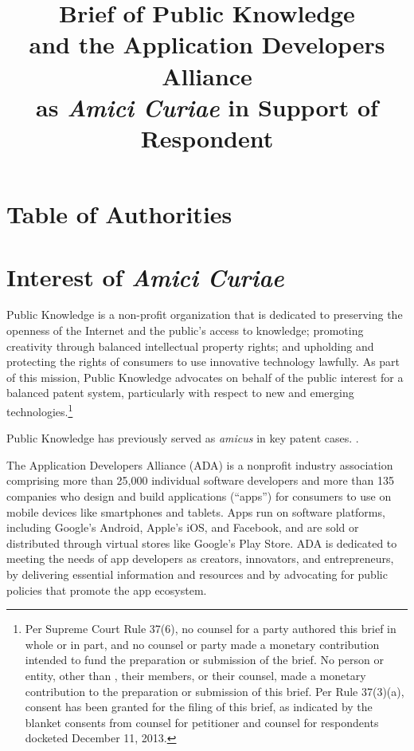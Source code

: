 \documentclass{scotus}
\title{Brief of Public Knowledge \protect\\
and the Application Developers Alliance \protect\\
as \emph{Amici Curiae} in Support of Respondent}
\begin{document}
\maketitle

\romanpagenumbers
\tableofcontents

\part{Table of Authorities}

\tableofauthorities

\clearpage
\arabicpagenumbers

\part{Interest of \emph{Amici Curiae}}

Public Knowledge is a non-profit organization that is dedicated to preserving
the openness of the Internet and the public's access to knowledge; promoting
creativity through balanced intellectual property rights; and upholding and
protecting the rights of consumers to use innovative technology lawfully. As
part of this mission, Public Knowledge advocates on behalf of the public
interest for a balanced patent system, particularly with respect to new and
emerging technologies.\footnote{Per Supreme Court Rule 37(6), no counsel for a
party authored this brief in whole or in part, and no counsel or party made a
monetary contribution intended to fund the preparation or submission of the
brief. No person or entity, other than \amici, their members, or their counsel,
made a monetary contribution to the preparation or submission of this brief. Per
Rule 37(3)(a), consent has been granted for the filing of this brief, as
indicated by the blanket consents from counsel for petitioner and counsel for
respondents docketed December 11, 2013.}

Public Knowledge has previously served as \emph{amicus} in key patent cases.
.

The Application Developers Alliance (ADA) is a nonprofit industry association
comprising more than 25,000 individual software developers and more than 135
companies who design and build applications (“apps”) for consumers to use on
mobile devices like smartphones and tablets. Apps run on software platforms,
including Google’s Android, Apple’s iOS, and Facebook, and are sold or
distributed through virtual stores like Google’s Play Store. ADA is dedicated to
meeting the needs of app developers as creators, innovators, and entrepreneurs,
by delivering essential information and resources and by advocating for public
policies that promote the app ecosystem.
\end{document}
